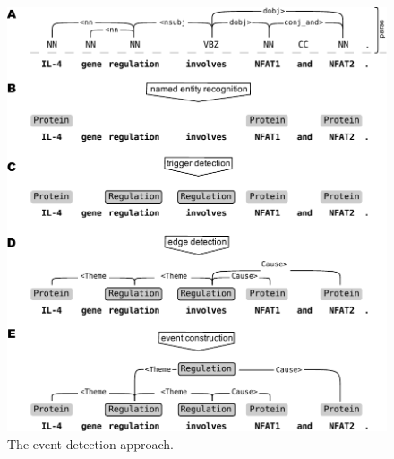 \documentclass[a4paper,12pt]{article}
\begin{document}
\begin{figure}[h]
\begin{center}
\includegraphics[scale=0.75]{Figures/model-sentence-pubmed1p.pdf}
\end{center}
\caption{The event detection approach.}
\label{fig-sentence}
\end{figure}
\end{document}
